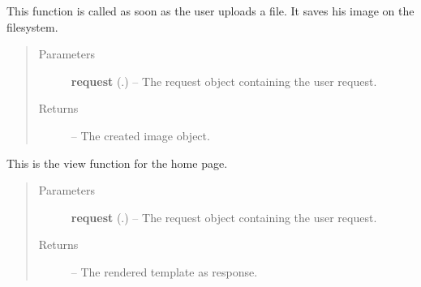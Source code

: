 \documentclass[letterpaper,10pt,english]{sphinxmanual}
\begin{document}
\begin{fulllineitems}
\label{Contour.contour:Contour.contour.views.handle_uploaded_file}
This function is called as soon as the user uploads a file. It saves his image on the filesystem.
\begin{quote}\begin{description}
\item[{Parameters}] \leavevmode
\textbf{request} (.) -- The request object containing the user request.

\item[{Returns}] \leavevmode
{} -- The created image object.

\end{description}\end{quote}

\end{fulllineitems}


\begin{fulllineitems}
\label{Contour.contour:Contour.contour.views.index}
This is the view function for the home page.
\begin{quote}\begin{description}
\item[{Parameters}] \leavevmode
\textbf{request} (.) -- The request object containing the user request.

\item[{Returns}] \leavevmode
{} -- The rendered template as response.

\end{description}\end{quote}

\end{fulllineitems}

\end{document}

